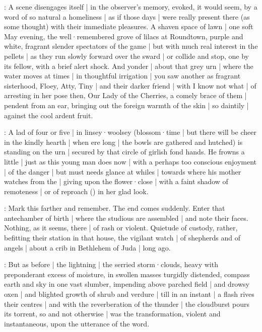 \begin{omitted}

:
A scene disengages itself |
in the observer's memory,
evoked,
it would seem,
by a word of so natural a homeliness |
as if those days |
were really present there
(as some thought)
with their immediate pleasures.
A shaven space of lawn |
one soft May evening,
the well·remembered grove of lilacs at Roundtown,
purple and white,
fragrant slender spectators of the game |
but with much real interest in the pellets |
as they run slowly forward over the sward |
or collide and stop,
one by its fellow,
with a brief alert shock.
And yonder |
about that grey urn |
where the water moves at times |
in thoughtful irrigation |
you saw another as fragrant sisterhood,
Floey,
Atty,
Tiny |
and their darker friend |
with I know not what |
of arresting in her pose then,
Our Lady of the Cherries,
a comely brace of them |
pendent from an ear,
bringing out the foreign warmth of the skin |
so daintily |
against the cool ardent fruit.

:
A lad of four or five |
in linsey·woolsey
(blossom·time |
but there will be cheer in the kindly hearth |
when ere long |
the bowls are gathered and hutched)
is standing on the urn |
secured by that circle of girlish fond hands.
He frowns a little |
just as this young man does now |
with a perhaps too conscious enjoyment |
of the danger |
but must needs glance at whiles |
towards where his mother watches from the  |
giving upon the flower·close |
with a faint shadow of remoteness |
or of reproach
()
in her glad look.
\end{omitted}


:
Mark this farther and remember.
The end comes suddenly.
Enter that ante\-chamber of birth |
where the studious are assembled |
and note their faces.
Nothing,
as it seems,
there |
of rash or violent.
Quietude of custody,
rather,
befitting their station in that house,
the vigilant watch |
of shepherds and of angels |
about a crib in Bethlehem of Juda |
long ago.

:
But as before |
the lightning |
the serried storm·clouds,
heavy with preponderant excess of moisture,
in swollen masses turgidly distended,
compass earth and sky in one vast slumber,
impending above parched field |
and drowsy oxen |
and blighted growth of shrub and verdure |
till in an instant |
a flash rives their centres |
and with the reverberation of the thunder |
the cloudburst pours its torrent,
so and not otherwise |
was the transformation,
violent and instantaneous,%
upon the utterance of the word.

